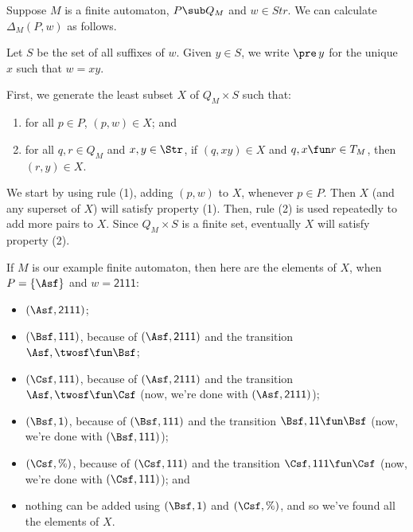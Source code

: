 Suppose $M$ is a finite automaton, $P\sub Q_M$ and $w\in Str$.
We can calculate $\Delta_M(P,w)$ as follows.
%
%
%

Let $S$ be the set of all suffixes of $w$.  Given $y\in S$, we write
$\pre\,y$ for the unique $x$ such that $w=xy$.

First, we generate the least subset $X$ of $Q_M\times S$ such that:
\begin{enumerate}[(1)]
\item for all $p\in P$, $(p,w)\in X$; and

\item for all $q,r\in Q_M$ and $x,y\in\Str$, if
$(q,xy)\in X$ and $q,x\fun r\in T_M$, then
$(r,y)\in X$.
\end{enumerate}
We start by using rule (1), adding $(p,w)$ to $X$, whenever $p\in P$.
Then $X$ (and any superset of $X$) will satisfy property (1).
Then, rule (2) is used repeatedly to add more pairs to $X$.  Since
$Q_M\times S$ is a finite set, eventually $X$ will satisfy property (2).

If $M$ is our example finite automaton, then here are the elements of
$X$, when $P=\{\Asf\}$ and $w=\mathsf{2111}$:
\begin{itemize}
\item $(\Asf,\mathsf{2111})$;

\item $(\Bsf,\mathsf{111})$, because of $(\Asf,\mathsf{2111})$ and the
  transition $\Asf,\twosf\fun\Bsf$;

\item $(\Csf, \mathsf{111})$, because of $(\Asf,\mathsf{2111})$ and
  the transition $\Asf,\twosf\fun\Csf$ (now, we're done with
  $(\Asf,\mathsf{2111})$);

\item $(\Bsf,\mathsf{1})$, because of $(\Bsf,\mathsf{111})$ and the
  transition $\Bsf,\mathsf{11}\fun\Bsf$ (now, we're done with
  $(\Bsf,\mathsf{111})$);

\item $(\Csf, \%)$, because of $(\Csf, \mathsf{111})$ and the
  transition $\Csf,\mathsf{111}\fun\Csf$ (now, we're done with $(\Csf,
  \mathsf{111})$); and

\item nothing can be added using $(\Bsf,\mathsf{1})$ and $(\Csf, \%)$,
and so we've found all the elements of $X$.
\end{itemize}

